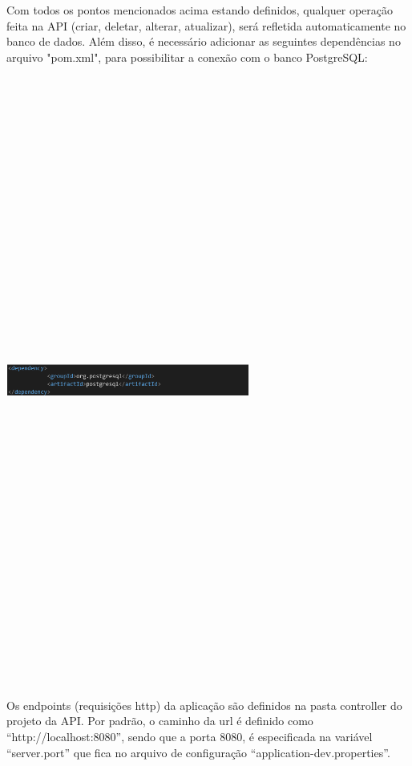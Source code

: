 \documentclass[conference]{IEEEtran}
\begin{document}
Com todos os pontos mencionados acima estando definidos, qualquer operação feita na API (criar, deletar, alterar, atualizar), será refletida automaticamente no banco de dados.
Além disso, é necessário adicionar as seguintes dependências no arquivo "pom.xml", para possibilitar a conexão com o banco PostgreSQL:

\vspace{7mm}
\centerline{\includegraphics[width=80mm,height=200mm,keepaspectratio]{Postgresql2.png}}
\vspace{7mm}

Os endpoints (requisições http) da aplicação são definidos na pasta controller do projeto da API. Por padrão, o caminho da url é definido como “http://localhost:8080”, sendo que a porta 8080, é especificada na variável “server.port” que fica no arquivo de configuração “application-dev.properties”.
\end{document}
